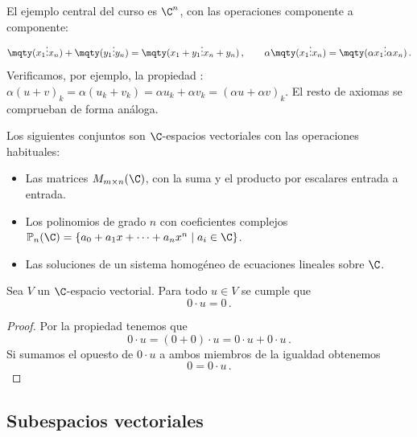 \begin{eje}
  El ejemplo central del curso es $\C^n$, con las operaciones componente a componente:
  \[
    \mqty(x_1\\\vdots\\x_n) + \mqty(y_1\\\vdots\\y_n) = \mqty(x_1+y_1\\\vdots\\x_n+y_n)\,,
    \qquad
    \alpha\mqty(x_1\\\vdots\\x_n) = \mqty(\alpha x_1\\\vdots\\\alpha x_n)\,.
  \]
  Verificamos, por ejemplo, la propiedad : $\alpha(u+v)_k = \alpha(u_k+v_k) = \alpha u_k + \alpha v_k = (\alpha u + \alpha v)_k$. El resto de axiomas se comprueban de forma análoga.
\end{eje}

\begin{eje}
  Los siguientes conjuntos son $\C$-espacios vectoriales con las operaciones habituales:
  \begin{itemize}
    \item Las matrices $M_{m\times n}(\C)$, con la suma y el producto por escalares entrada a entrada.
    \item Los polinomios de grado $n$ con coeficientes complejos $\mathbb{P}_n(\C) = \{a_0+a_1x+\cdots+a_nx^n \mid a_i\in\C\}$.
    \item Las soluciones de un sistema homogéneo de ecuaciones lineales sobre $\C$.
  \end{itemize}
\end{eje}

\begin{prop}
  \label{prop:cero-por-vector}
  Sea $V$ un $\C$-espacio vectorial. Para todo $u\in V$ se cumple que
  \[
    0 \cdot u = 0\,.
  \]
\end{prop}
\begin{proof}
  Por la propiedad  tenemos que
  \[
    0 \cdot u = (0 + 0) \cdot u = 0 \cdot u + 0 \cdot u\,.
  \]
  Si sumamos el opuesto de $0 \cdot u$ a ambos miembros de la igualdad obtenemos
  \[
    0 = 0 \cdot u\,.
  \]
\end{proof}

\subsection{Subespacios vectoriales}

